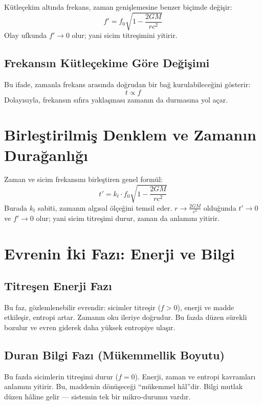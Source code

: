 \documentclass[12pt,a4paper]{article}
\begin{document}
Kütleçekim altında frekans, zaman genişlemesine benzer biçimde değişir:
\begin{equation}
f' = f_0 \sqrt{1 - \frac{2GM}{r c^2}}
\end{equation}
Olay ufkunda $f' \to 0$ olur; yani sicim titreşimini yitirir.

\subsection{Frekansın Kütleçekime Göre Değişimi}
Bu ifade, zamanla frekans arasında doğrudan bir bağ kurulabileceğini gösterir:
\begin{equation}
t \propto f
\end{equation}
Dolayısıyla, frekansın sıfıra yaklaşması zamanın da durmasına yol açar.

\section{Birleştirilmiş Denklem ve Zamanın Durağanlığı}
Zaman ve sicim frekansını birleştiren genel formül:
\begin{equation}
t' = k_t \cdot f_0 \sqrt{1 - \frac{2GM}{r c^2}}
\end{equation}
Burada $k_t$ sabiti, zamanın algısal ölçeğini temsil eder. 
$r \to \frac{2GM}{c^2}$ olduğunda $t' \to 0$ ve $f' \to 0$ olur; 
yani sicim titreşimi durur, zaman da anlamını yitirir.

\section{Evrenin İki Fazı: Enerji ve Bilgi}

\subsection{Titreşen Enerji Fazı}
Bu faz, gözlemlenebilir evrendir: sicimler titreşir ($f > 0$), enerji ve madde etkileşir, entropi artar. 
Zamanın oku ileriye doğrudur. 
Bu fazda düzen sürekli bozulur ve evren giderek daha yüksek entropiye ulaşır.

\subsection{Duran Bilgi Fazı (Mükemmellik Boyutu)}
Bu fazda sicimlerin titreşimi durur ($f = 0$). 
Enerji, zaman ve entropi kavramları anlamını yitirir. 
Bu, maddenin dönüşeceği ``mükemmel hâl''dir. 
Bilgi mutlak düzen hâline gelir — sistemin tek bir mikro-durumu vardır. 
\end{document}
